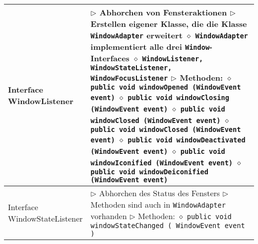 \begin{longtable}{ | p{} p{} | }
	\makecell[l]{Interface \\ WindowListener} & \makecell[l]{
	$\triangleright$ Abhorchen von Fensteraktionen \\
	$\triangleright$ Erstellen eigener Klasse, die die Klasse \texttt{WindowAdapter} erweitert \\
	\hspace{0.4cm} $\diamond$ \texttt{WindowAdapter} implementiert alle drei \texttt{Window}-Interfaces \\
	\hspace{0.4cm} $\diamond$ \texttt{WindowListener, WindowStateListener, WindowFocusListener} \\
	$\triangleright$ Methoden: \\
	\hspace{0.4cm} $\diamond$ \texttt{public void windowOpened (WindowEvent event)} \\
	\hspace{0.4cm} $\diamond$ \texttt{public void windowClosing (WindowEvent event)} \\
	\hspace{0.4cm} $\diamond$ \texttt{public void windowClosed (WindowEvent event)} \\
	\hspace{0.4cm} $\diamond$ \texttt{public void windowClosed (WindowEvent event)} \\
	\hspace{0.4cm} $\diamond$ \texttt{public void windowDeactivated (WindowEvent event)} \\
	\hspace{0.4cm} $\diamond$ \texttt{public void windowIconified (WindowEvent event)} \\
	\hspace{0.4cm} $\diamond$ \texttt{public void windowDeiconified (WindowEvent event)}} \\ \hline

	\makecell[l]{Interface \\ WindowStateListener} & \makecell[l]{
	$\triangleright$ Abhorchen des Status des Fensters \\
	$\triangleright$ Methoden sind auch in \texttt{WindowAdapter} vorhanden \\
	$\triangleright$ Methoden: \\
	\hspace{0.4cm} $\diamond$ \texttt{public void windowStateChanged ( WindowEvent event )}} \\ \hline


\end{longtable}
